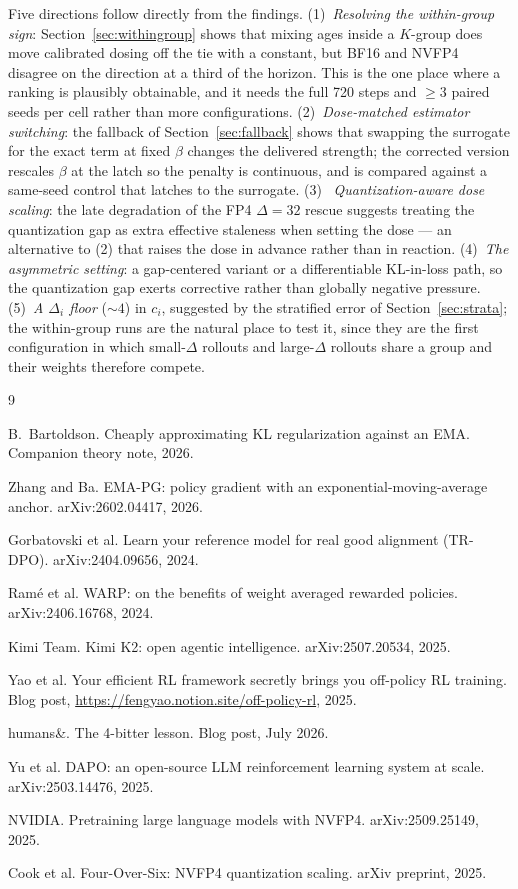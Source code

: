 \documentclass[11pt]{amsart}
\begin{document}
Five directions follow directly from the findings. (1)~\emph{Resolving the
within-group sign}: Section~\ref{sec:withingroup} shows that mixing ages
inside a $K$-group does move calibrated dosing off the tie with a constant,
but BF16 and NVFP4 disagree on the direction at a third of the horizon. This
is the one place where a ranking is plausibly obtainable, and it needs the
full 720 steps and $\ge3$ paired seeds per cell rather than more
configurations. (2)~\emph{Dose-matched estimator switching}: the fallback of
Section~\ref{sec:fallback} shows that swapping the surrogate for the exact
term at fixed $\beta$ changes the delivered strength; the corrected version
rescales $\beta$ at the latch so the penalty is continuous, and is compared
against a same-seed control that latches to the surrogate. (3)~\emph{%
Quantization-aware dose scaling}: the late degradation of the FP4
$\Delta{=}32$ rescue suggests treating the quantization gap as extra
effective staleness when setting the dose --- an alternative to (2) that
raises the dose in advance rather than in reaction. (4)~\emph{The asymmetric
setting}: a gap-centered variant or a differentiable KL-in-loss path, so the
quantization gap exerts corrective rather than globally negative pressure.
(5)~\emph{A $\Delta_i$ floor} (${\sim}4$) in $c_i$, suggested by the
stratified error of Section~\ref{sec:strata}; the within-group runs are the
natural place to test it, since they are the first configuration in which
small-$\Delta$ rollouts and large-$\Delta$ rollouts share a group and their
weights therefore compete.

\begin{thebibliography}{9}\small

B.~Bartoldson.
Cheaply approximating KL regularization against an EMA.
Companion theory note, 2026.

Zhang and Ba.
EMA-PG: policy gradient with an exponential-moving-average anchor.
arXiv:2602.04417, 2026.

Gorbatovski et al.
Learn your reference model for real good alignment (TR-DPO).
arXiv:2404.09656, 2024.

Ram\'e et al.
WARP: on the benefits of weight averaged rewarded policies.
arXiv:2406.16768, 2024.

Kimi Team.
Kimi K2: open agentic intelligence.
arXiv:2507.20534, 2025.

Yao et al.
Your efficient RL framework secretly brings you off-policy RL training.
Blog post, \url{https://fengyao.notion.site/off-policy-rl}, 2025.

humans\&.
The 4-bitter lesson.
Blog post, July 2026.

Yu et al.
DAPO: an open-source LLM reinforcement learning system at scale.
arXiv:2503.14476, 2025.

NVIDIA.
Pretraining large language models with NVFP4.
arXiv:2509.25149, 2025.

Cook et al.
Four-Over-Six: NVFP4 quantization scaling.
arXiv preprint, 2025.

\end{thebibliography}
\end{document}
